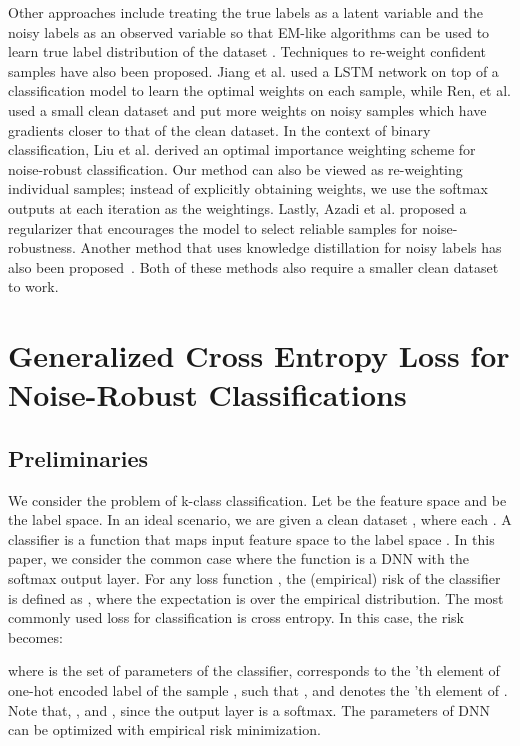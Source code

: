 \documentclass{article}
\begin{document}
Other approaches include treating the true labels as a latent variable and the noisy labels as an observed variable so that EM-like algorithms can be used to learn true label distribution of the dataset \cite{xiao2015learning,khetan2017learning,vahdat2017toward}. 
Techniques to re-weight confident samples have also been proposed. 
Jiang et al. \cite{jiang2017mentornet} used a LSTM network on top of a classification model to learn the optimal weights on each sample, while Ren, et al. \cite{ren2018learning} used a small clean dataset and put more weights on noisy samples which have gradients closer to that of the clean dataset. 
In the context of binary classification, 
Liu et al. \cite{liu2016classification} derived an optimal importance weighting scheme for noise-robust classification. Our method can also be viewed as re-weighting individual samples; instead of explicitly obtaining weights, we use the softmax outputs at each iteration as the weightings. 
Lastly, Azadi et al. \cite{azadi2015auxiliary} proposed a regularizer that encourages the model to select reliable samples for noise-robustness. Another method that uses knowledge distillation for noisy labels has also been proposed~\cite{li2017learning}. Both of these methods also require a smaller clean dataset to work. 

\section{Generalized Cross Entropy Loss for Noise-Robust Classifications}\label{sec_3}
\subsection{Preliminaries}
We consider the problem of k-class classification. Let  be the feature space and  be the label space. In an ideal scenario, we are given a clean dataset , where each . A classifier is a function that maps input feature space to the label space . In this paper, we consider the common case where the function is a DNN with the softmax output layer.
For any loss function , the (empirical) risk of the classifier  is defined as 
, where the expectation is over the empirical distribution.
The most commonly used loss for classification is cross entropy. In this case, the risk becomes:

where  is the set of parameters of the classifier,  corresponds to the 'th element of one-hot encoded label of the sample ,  such that , and  denotes the 'th element of . Note that, , and , since the output layer is a softmax. The parameters of DNN can be optimized with empirical risk minimization.
\end{document}
